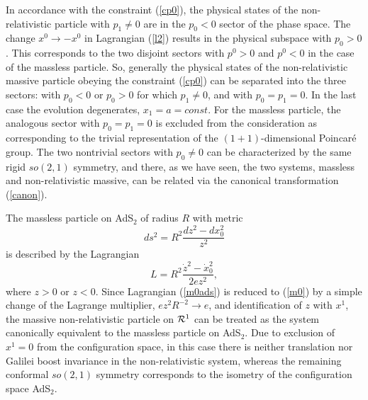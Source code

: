 \documentclass[a4paper,12pt]{article}
\begin{document}
In accordance with the constraint
(\ref{cp0}),
the physical states
of the non-relativistic particle
with $p_1\neq 0$  are in the $p_0<0$ sector
of the phase space.
The change
$x^0\rightarrow -x^0$ in Lagrangian (\ref{l2})
results in the physical subspace with $p_0>0$.
This corresponds to the two disjoint sectors with
$p^0>0$
and $p^0<0$
in the case of the massless particle.
So, generally the physical states
of the non-relativistic massive particle
obeying the constraint (\ref{cp0})
can be separated into the three sectors:
with $p_0<0$ or $p_0>0$ for which $p_1\neq 0$,
and with $p_0=p_1=0$.
In the last case the
evolution degenerates,
$x_1=a=const$.
For the massless particle,
the analogous sector
with $p_0=p_1=0$
is excluded from the consideration
as corresponding to the trivial representation
of the $(1+1)$-dimensional Poincar\'e group.
The two nontrivial sectors
with $p_0\neq 0$
can be  characterized
by the same rigid $so(2,1)$ symmetry, and
there, as we have seen,
the two systems, massless
and non-relativistic massive,
can be related via the canonical transformation
(\ref{canon}).




The massless particle on AdS${}_2$
of radius $R$
with metric \cite{Ahar}
$$
ds^2=R^2\frac{d z^2-dx_0^2}{z^2}
$$
is described by the Lagrangian
\begin{equation}
L=R^2\frac{\dot z^2-\dot x_0^2}{2ez^2},
\label{m0ads}
\end{equation}
where $z>0$ or $z<0$.
Since Lagrangian (\ref{m0ads}) is reduced to
(\ref{m0}) by a simple change of the
Lagrange multiplier,
$ez^2R^{-2}\rightarrow e$,
and identification of $z$ with $x^1$,
the massive non-relativistic particle
on ${\cal R}^1$ can be treated  as
the system
canonically equivalent to
the massless particle on AdS${}_2$.
Due to exclusion of
$x^1=0$ from the configuration space,
in this case there is neither translation nor
Galilei boost invariance in the non-relativistic
system,
whereas the remaining conformal $so(2,1)$
symmetry corresponds to the isometry of
the configuration space
AdS${}_2$.
\end{document}
